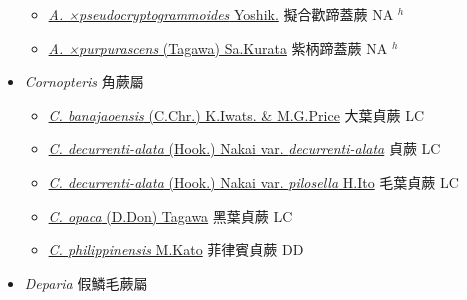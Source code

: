 \begin{itemize}
\begin{itemize}
        \item[] \href{http://www.theplantlist.org/tpl1.1/search?q=Athyrium+×pseudocryptogrammoides}{\textit{A. ×pseudocryptogrammoides} Yoshik.}   擬合歡蹄蓋蕨 NA $^h$
        \item[] \href{http://www.theplantlist.org/tpl1.1/search?q=Athyrium+×purpurascens}{\textit{A. ×purpurascens} (Tagawa) Sa.Kurata}   紫柄蹄蓋蕨 NA $^h$
  \end{itemize}
 \item[] \textit{Cornopteris} 角蕨屬
                    
  \begin{itemize}
        \item[] \href{http://www.theplantlist.org/tpl1.1/search?q=Cornopteris+banajaoensis}{\textit{C. banajaoensis} (C.Chr.) K.Iwats. \& M.G.Price}     大葉貞蕨 LC
        \item[] \href{http://www.theplantlist.org/tpl1.1/search?q=Cornopteris+decurrenti-alata+var.+decurrenti-alata}{\textit{C. decurrenti-alata} (Hook.) Nakai var. \textit{decurrenti-alata}}   貞蕨 LC
        \item[] \href{http://www.theplantlist.org/tpl1.1/search?q=Cornopteris+decurrenti-alata+var.+pilosella}{\textit{C. decurrenti-alata} (Hook.) Nakai var. \textit{pilosella} H.Ito}   毛葉貞蕨 LC
        \item[] \href{http://www.theplantlist.org/tpl1.1/search?q=Cornopteris+opaca}{\textit{C. opaca} (D.Don) Tagawa}   黑葉貞蕨 LC
        \item[] \href{http://www.theplantlist.org/tpl1.1/search?q=Cornopteris+philippinensis}{\textit{C. philippinensis} M.Kato}   菲律賓貞蕨 DD
  \end{itemize}
 \item[] \textit{Deparia} 假鱗毛蕨屬
                    

\end{itemize}
